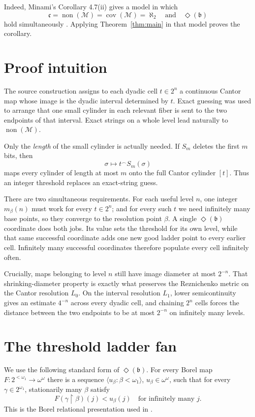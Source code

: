 \documentclass[11pt]{article}
\newcommand{\ww}{\omega^\omega}
\newcommand{\cM}{\mathcal M}
\newcommand{\concat}{\mathbin{{}^\frown}}
\begin{document}
Indeed, Minami's Corollary 4.7(ii) gives a model in which
\[
 \mathfrak c=\operatorname{non}(\cM)=\operatorname{cov}(\cM)=\aleph_2
 \quad\text{and}\quad \Diamond(\mathfrak b)
\]
hold simultaneously \cite[Corollary 4.7(ii), p.~762]{Minami}.  Applying
Theorem~\ref{thm:main} in that model proves the corollary.

\section{Proof intuition}

The source construction assigns to each dyadic cell $t\in2^n$ a continuous
Cantor map whose image is the dyadic interval determined by $t$.  Exact
guessing was used to arrange that one small cylinder in each relevant fiber is
sent to the two endpoints of that interval.  Exact strings on a whole level
lead naturally to $\operatorname{non}(\cM)$.

Only the \emph{length} of the small cylinder is actually needed.  If $S_m$
deletes the first $m$ bits, then
\[
             \sigma\longmapsto t\concat S_m(\sigma)
\]
maps every cylinder of length at most $m$ onto the full Cantor cylinder $[t]$.
Thus an integer threshold replaces an exact-string guess.

There are two simultaneous requirements.  For each useful level $n$, one
integer $m_\beta(n)$ must work for every $t\in2^n$; and for every such $t$ we
need infinitely many base points, so they converge to the resolution point
$\beta$.  A single $\Diamond(\mathfrak b)$ coordinate does both jobs.  Its value
sets the threshold for its own level, while that same successful coordinate
adds one new good ladder point to every earlier cell.  Infinitely many
successful coordinates therefore populate every cell infinitely often.

Crucially, maps belonging to level $n$ still have image diameter at most
$2^{-n}$.  That shrinking-diameter property is exactly what preserves the
Reznichenko metric on the Cantor resolution $L_0$.  On the interval resolution
$L_1$, lower semicontinuity gives an estimate $4^{-n}$ across every dyadic
cell, and chaining $2^n$ cells forces the distance between the two endpoints
to be at most $2^{-n}$ on infinitely many levels.

\section{The threshold ladder fan}

We use the following standard form of $\Diamond(\mathfrak b)$.  For every
Borel map $F:2^{<\omega_1}\to\ww$ there is a sequence
$\langle u_\beta:\beta<\omega_1\rangle$, $u_\beta\in\ww$, such that for every
$\gamma\in2^{\omega_1}$, stationarily many $\beta$ satisfy
\begin{equation}\label{eq:diamond}
       F(\gamma\mathbin{\upharpoonright}\beta)(j)<u_\beta(j)
       \quad\text{for infinitely many }j.
\end{equation}
This is the Borel relational presentation used in \cite{MHD,Minami,MC}.
\end{document}
